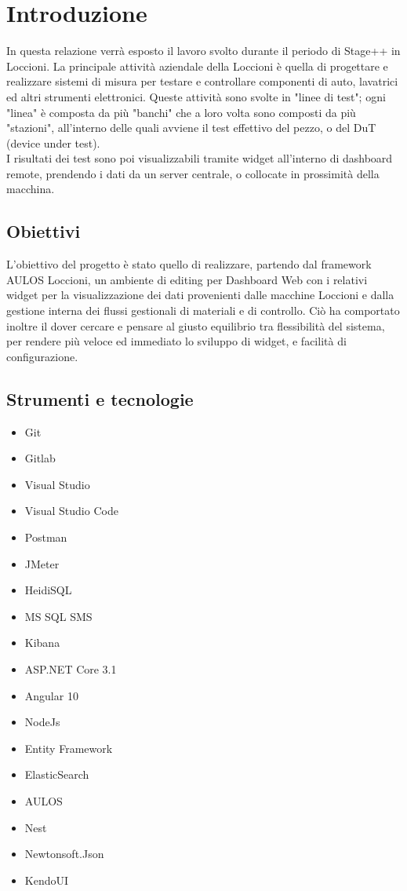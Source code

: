 \chapter{Introduzione}
\label{chap:intro}

In questa relazione verrà esposto il lavoro svolto durante il periodo di Stage++ in Loccioni.
La principale attività aziendale della Loccioni è quella di progettare e realizzare sistemi di misura per 
testare e controllare componenti di auto, lavatrici ed altri strumenti elettronici.
Queste attività sono svolte in "linee di test"; ogni "linea" è composta da più "banchi" che a loro volta sono composti da più "stazioni", all'interno delle quali avviene 
il test effettivo del pezzo, o del DuT (device under test).\\
I risultati dei test sono poi visualizzabili tramite widget all'interno di dashboard remote, prendendo i dati da un server centrale, 
o collocate in prossimità della macchina.


\section{Obiettivi}
L'obiettivo del progetto è stato quello di realizzare, partendo dal framework AULOS Loccioni, un ambiente di editing per
Dashboard Web con i relativi widget per la visualizzazione dei dati provenienti dalle macchine Loccioni e dalla gestione 
interna dei flussi gestionali di materiali e di controllo. Ciò ha comportato inoltre il dover cercare e pensare al giusto equilibrio 
tra flessibilità del sistema, per rendere più veloce ed immediato lo sviluppo di widget, e facilità di configurazione.

\section{Strumenti e tecnologie}
    \begin{multicols}{3}
    \begin{itemize}
        \item Git
        \item Gitlab
        \item Visual Studio
        \item Visual Studio Code
        \item Postman
        \item JMeter
        \item HeidiSQL
        \item MS SQL SMS
        \item Kibana
        \item ASP.NET Core 3.1
        \item Angular 10
        \item NodeJs
        \item Entity Framework
        \item ElasticSearch
        \item AULOS
        \item Nest
        \item Newtonsoft.Json
        \item KendoUI
    \end{itemize}
    \end{multicols}

